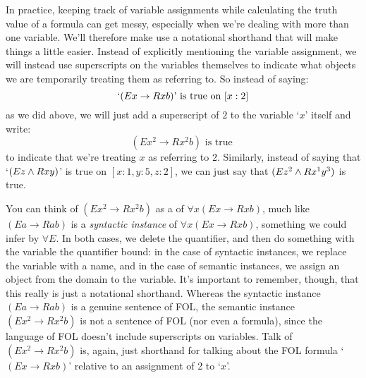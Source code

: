 In practice, keeping track of variable assignments while calculating the truth value of a formula can get messy, especially when we're dealing with more than one variable.  We'll therefore make use a notational shorthand that will make things a little easier.  Instead of explicitly mentioning the variable assignment, we will instead use superscripts on the variables themselves to indicate what objects we are temporarily treating them as referring to.  So instead of saying:
$$`(Ex \rightarrow Rxb) \text{' is true on } [x:2]$$
as we did above, we will just add a superscript of $2$ to the variable `$x$' itself and write:
$$(Ex^2 \rightarrow Rx^2b) \text{ is true }$$
to indicate that we're treating $x$ as referring to 2.  Similarly, instead of saying that `$(Ez \wedge Rxy)$' is true on $[x: 1, y:5, z:2]$, we can just say that $(Ez^2 \wedge Rx^1y^3)$ is true.

You can think of $(Ex^2 \rightarrow Rx^2b)$ as a  of $\forall x(Ex \rightarrow Rxb)$, much like $(Ea \rightarrow Rab)$ is a \emph{syntactic instance} of $\forall x(Ex \rightarrow Rxb)$, something we could infer by $\forall E$.  In both cases, we delete the quantifier, and then do something with the variable the quantifier bound: in the case of syntactic instances, we replace the variable with a name, and in the case of semantic instances, we assign an object from the domain to the variable.  
It's important to remember, though, that this really is just a notational shorthand.  Whereas the syntactic instance $(Ea \rightarrow Rab)$ is a genuine sentence of FOL, the semantic instance $(Ex^2 \rightarrow Rx^2b)$ is not a sentence of FOL (nor even a formula), since the language of FOL doesn't include superscripts on variables.  Talk of $(Ex^2 \rightarrow Rx^2b)$ is, again, just shorthand for talking about the FOL formula `$(Ex \rightarrow Rxb)$' relative to an assignment of 2 to `$x$'.

